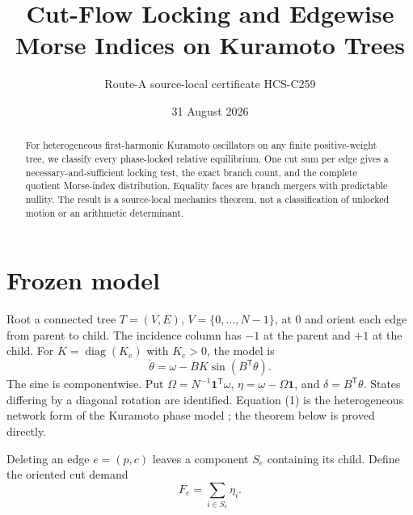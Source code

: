 \documentclass[10pt]{article}
\title{Cut-Flow Locking and Edgewise Morse Indices on Kuramoto Trees}
\author{Route-A source-local certificate HCS-C259}
\date{31 August 2026}
\newcommand{\one}{\mathbf 1}
\begin{document}
\maketitle
\begin{abstract}
For heterogeneous first-harmonic Kuramoto oscillators on any finite
positive-weight tree, we classify every phase-locked relative equilibrium.
One cut sum per edge gives a necessary-and-sufficient locking test, the exact
branch count, and the complete quotient Morse-index distribution.  Equality
faces are branch mergers with predictable nullity.  The result is a
source-local mechanics theorem, not a classification of unlocked motion or
an arithmetic determinant.
\end{abstract}

\section{Frozen model}
Root a connected tree $T=(V,E)$, $V=\{0,\ldots,N-1\}$, at $0$ and orient
each edge from parent to child.  The incidence column has $-1$ at the parent
and $+1$ at the child.  For $K=\operatorname{diag}(K_e)$ with $K_e>0$, the
model is
\begin{equation}
 \dot\theta=\omega-BK\sin(B^{\mathsf T}\theta).
\end{equation}
The sine is componentwise.  Put
$\Omega=N^{-1}\one^{\mathsf T}\omega$, $\eta=\omega-\Omega\one$,
and $\delta=B^{\mathsf T}\theta$.  States differing by a diagonal rotation
are identified.  Equation (1) is the heterogeneous network form of the
Kuramoto phase model \cite{Kuramoto}; the theorem below is proved directly.

Deleting an edge $e=(p,c)$ leaves a component $S_e$ containing its child.
Define the oriented cut demand
\begin{equation}
 F_e=\sum_{i\in S_e}\eta_i.
\end{equation}
\end{document}

